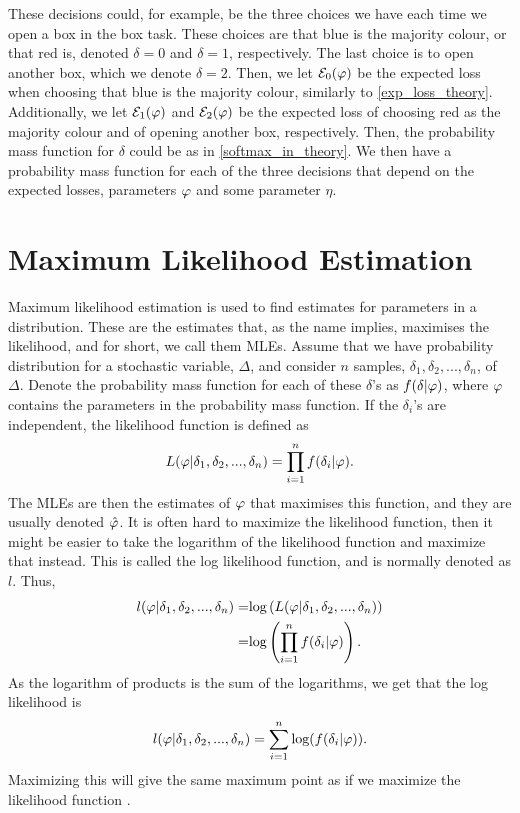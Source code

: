 These decisions could, for example, be the three choices we have each time we open a box in the box task. These choices are that blue is the majority colour, or that red is, denoted $\delta=0$ and $\delta=1$, respectively. The last choice is to open another box, which we denote $\delta=2$. Then, we let $\mathcal{E}_0(\varphi)$ be the expected loss when choosing that blue is the majority colour, similarly to \eqref{exp_loss_theory}. Additionally, we let $\mathcal{E}_1(\varphi)$ and $\mathcal{E}_2(\varphi)$ be the expected loss of choosing red as the majority colour and of opening another box, respectively. Then, the probability mass function for $\delta$ could be as in \eqref{softmax_in_theory}. We then have a probability mass function for each of the three decisions that depend on the expected losses, parameters $\varphi$ and some parameter $\eta$.




\section{Maximum Likelihood Estimation}
\label{section_theory_mle}

Maximum likelihood estimation is used to find estimates for parameters in a distribution. These are the estimates that, as the name implies, maximises the likelihood, and for short, we call them MLEs. Assume that we have probability distribution for a stochastic variable, $\Delta$, and consider $n$ samples, $\delta_1,\delta_2,...,\delta_n$, of $\Delta$. Denote the probability mass function for each of these $\delta$'s as $f(\delta|\varphi)$, where $\varphi$ contains the parameters in the probability mass function. If the $\delta_i$'s are independent, the likelihood function is defined as
\begin{equation}
\label{likelihood}
    L(\varphi|\delta_1,\delta_2,...,\delta_n) =  \prod_{i=1}^{n} f(\delta_i|\varphi).
\end{equation} 
The MLEs are then the estimates of $\varphi$ that maximises this function, and they are usually denoted $\hat{\varphi}$. It is often hard to maximize the likelihood function, then it might be easier to take the logarithm of the likelihood function and maximize that instead. This is called the log likelihood function, and is normally denoted as $l$. Thus,
\begin{equation}
\label{chap2:log_likelihood}
    \begin{aligned}
        l(\varphi|\delta_1,\delta_2,...,\delta_n) 
        =& \text{log}\left(L(\varphi|\delta_1,\delta_2,...,\delta_n)\right)\\
        =& \text{log}\left(\prod_{i=1}^{n} f(\delta_i|\varphi) \right).
    \end{aligned}
\end{equation}
As the logarithm of products is the sum of the logarithms, we get that the log likelihood is
\begin{equation}
\label{chap2:log_likelihood2}
    \begin{aligned}
        l(\varphi|\delta_1,\delta_2,...,\delta_n) = \sum_{i=1}^n \text{log}(f(\delta_i|\varphi)).
    \end{aligned}
\end{equation}
Maximizing this will give the same maximum point as if we maximize the likelihood function \citep{statinf}. 

